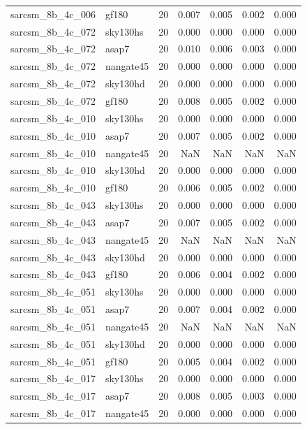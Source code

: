 \begin{tabular}{llrrrrr}
sarcsm\_8b\_4c\_006 & gf180 & 20 & 0.007 & 0.005 & 0.002 & 0.000 \\
sarcsm\_8b\_4c\_072 & sky130hs & 20 & 0.000 & 0.000 & 0.000 & 0.000 \\
sarcsm\_8b\_4c\_072 & asap7 & 20 & 0.010 & 0.006 & 0.003 & 0.000 \\
sarcsm\_8b\_4c\_072 & nangate45 & 20 & 0.000 & 0.000 & 0.000 & 0.000 \\
sarcsm\_8b\_4c\_072 & sky130hd & 20 & 0.000 & 0.000 & 0.000 & 0.000 \\
sarcsm\_8b\_4c\_072 & gf180 & 20 & 0.008 & 0.005 & 0.002 & 0.000 \\
sarcsm\_8b\_4c\_010 & sky130hs & 20 & 0.000 & 0.000 & 0.000 & 0.000 \\
sarcsm\_8b\_4c\_010 & asap7 & 20 & 0.007 & 0.005 & 0.002 & 0.000 \\
sarcsm\_8b\_4c\_010 & nangate45 & 20 & NaN & NaN & NaN & NaN \\
sarcsm\_8b\_4c\_010 & sky130hd & 20 & 0.000 & 0.000 & 0.000 & 0.000 \\
sarcsm\_8b\_4c\_010 & gf180 & 20 & 0.006 & 0.005 & 0.002 & 0.000 \\
sarcsm\_8b\_4c\_043 & sky130hs & 20 & 0.000 & 0.000 & 0.000 & 0.000 \\
sarcsm\_8b\_4c\_043 & asap7 & 20 & 0.007 & 0.005 & 0.002 & 0.000 \\
sarcsm\_8b\_4c\_043 & nangate45 & 20 & NaN & NaN & NaN & NaN \\
sarcsm\_8b\_4c\_043 & sky130hd & 20 & 0.000 & 0.000 & 0.000 & 0.000 \\
sarcsm\_8b\_4c\_043 & gf180 & 20 & 0.006 & 0.004 & 0.002 & 0.000 \\
sarcsm\_8b\_4c\_051 & sky130hs & 20 & 0.000 & 0.000 & 0.000 & 0.000 \\
sarcsm\_8b\_4c\_051 & asap7 & 20 & 0.007 & 0.004 & 0.002 & 0.000 \\
sarcsm\_8b\_4c\_051 & nangate45 & 20 & NaN & NaN & NaN & NaN \\
sarcsm\_8b\_4c\_051 & sky130hd & 20 & 0.000 & 0.000 & 0.000 & 0.000 \\
sarcsm\_8b\_4c\_051 & gf180 & 20 & 0.005 & 0.004 & 0.002 & 0.000 \\
sarcsm\_8b\_4c\_017 & sky130hs & 20 & 0.000 & 0.000 & 0.000 & 0.000 \\
sarcsm\_8b\_4c\_017 & asap7 & 20 & 0.008 & 0.005 & 0.003 & 0.000 \\
sarcsm\_8b\_4c\_017 & nangate45 & 20 & 0.000 & 0.000 & 0.000 & 0.000 \\

\end{tabular}
